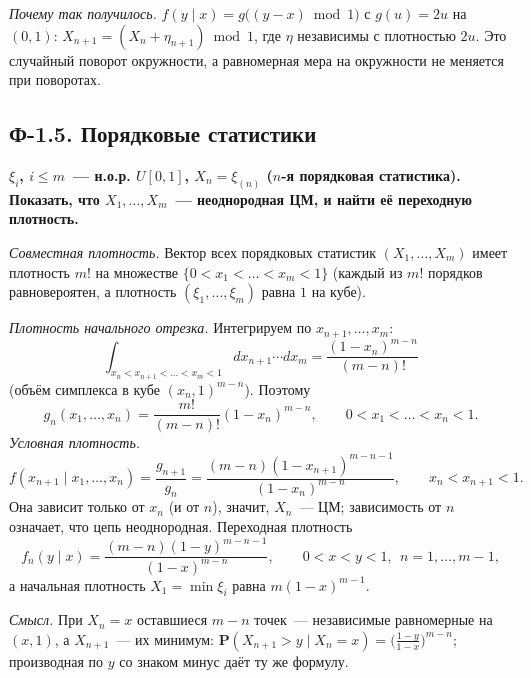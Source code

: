\documentclass[11pt,a4paper]{article}
\theoremstyle{definition}
\newcommand{\PP}{\mathbf P}
\newcommand{\1}{\mathbf 1}
\newenvironment{task}[1]{\par\medskip\noindent\colorbox{black!7}{\parbox{\dimexpr\linewidth-2\fboxsep}{\textbf{#1}}}\par\smallskip}{\par}
\begin{document}
\emph{Почему так получилось.} $f(y\mid x)=g\bigl((y-x)\bmod1\bigr)$ с
$g(u)=2u$ на $(0,1)$: $X_{n+1}=(X_n+\eta_{n+1})\bmod1$, где $\eta$ независимы
с плотностью $2u$. Это случайный поворот окружности, а равномерная мера на
окружности не меняется при поворотах.

\subsection{Ф-1.5. Порядковые статистики}

\begin{task}{$\xi_i$, $i\le m$~--- н.о.р. $U[0,1]$, $X_n=\xi_{(n)}$ ($n$-я
порядковая статистика). Показать, что $X_1,\dots,X_m$~--- неоднородная ЦМ, и
найти её переходную плотность.}
\end{task}
\emph{Совместная плотность.} Вектор всех порядковых статистик
$(X_1,\dots,X_m)$ имеет плотность $m!$ на множестве
$\{0<x_1<\dots<x_m<1\}$ (каждый из $m!$ порядков равновероятен, а плотность
$(\xi_1,\dots,\xi_m)$ равна $1$ на кубе).

\emph{Плотность начального отрезка.} Интегрируем по $x_{n+1},\dots,x_m$:
\[
\int_{x_n<x_{n+1}<\dots<x_m<1}dx_{n+1}\cdots dx_m=\frac{(1-x_n)^{m-n}}{(m-n)!}
\]
(объём симплекса в кубе $(x_n,1)^{m-n}$). Поэтому
\[
g_n(x_1,\dots,x_n)=\frac{m!}{(m-n)!}(1-x_n)^{m-n},\qquad0<x_1<\dots<x_n<1 .
\]
\emph{Условная плотность.}
\[
f(x_{n+1}\mid x_1,\dots,x_n)=\frac{g_{n+1}}{g_n}
=\frac{(m-n)(1-x_{n+1})^{m-n-1}}{(1-x_n)^{m-n}},\qquad x_n<x_{n+1}<1 .
\]
Она зависит только от $x_n$ (и от $n$), значит, $X_n$~--- ЦМ; зависимость от
$n$ означает, что цепь неоднородная. Переходная плотность
\[
\boxed{f_n(y\mid x)=\frac{(m-n)(1-y)^{m-n-1}}{(1-x)^{m-n}},\qquad0<x<y<1,\ \ n=1,\dots,m-1,}
\]
а начальная плотность $X_1=\min\xi_i$ равна $m(1-x)^{m-1}$.

\emph{Смысл.} При $X_n=x$ оставшиеся $m-n$ точек~--- независимые равномерные
на $(x,1)$, а $X_{n+1}$~--- их минимум:
$\PP(X_{n+1}>y\mid X_n=x)=\bigl(\frac{1-y}{1-x}\bigr)^{m-n}$; производная по $y$
со знаком минус даёт ту же формулу.
\end{document}
